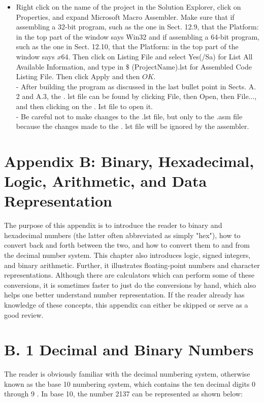 \documentclass[10pt]{book}
\begin{document}
\begin{itemize}
  \item Right click on the name of the project in the Solution Explorer, click on Properties, and expand Microsoft Macro Assembler. Make sure that if assembling a 32-bit program, such as the one in Sect. 12.9, that the Platform: in the top part of the window says Win32 and if assembling a 64-bit program, such as the one in Sect. 12.10, that the Platform: in the top part of the window says $x 64$. Then click on Listing File and select Yes(/Sa) for List All Available Information, and type in $\$$ (ProjectName).lst for Assembled Code Listing File. Then click Apply and then $O K$.\\
- After building the program as discussed in the last bullet point in Sects. A. 2 and A.3, the . lst file can be found by clicking File, then Open, then File..., and then clicking on the . Ist file to open it.\\
- Be careful not to make changes to the .lst file, but only to the .asm file because the changes made to the . lst file will be ignored by the assembler.
\end{itemize}

\section*{Appendix B: Binary, Hexadecimal, Logic, Arithmetic, and Data Representation}
The purpose of this appendix is to introduce the reader to binary and hexadecimal numbers (the latter often abbreviated as simply "hex"), how to convert back and forth between the two, and how to convert them to and from the decimal number system. This chapter also introduces logic, signed integers, and binary arithmetic. Further, it illustrates floating-point numbers and character representations. Although there are calculators which can perform some of these conversions, it is sometimes faster to just do the conversions by hand, which also helps one better understand number representation. If the reader already has knowledge of these concepts, this appendix can either be skipped or serve as a good review.

\section*{B. 1 Decimal and Binary Numbers}
The reader is obviously familiar with the decimal numbering system, otherwise known as the base 10 numbering system, which contains the ten decimal digits 0 through 9 . In base 10, the number 2137 can be represented as shown below:
\end{document}
